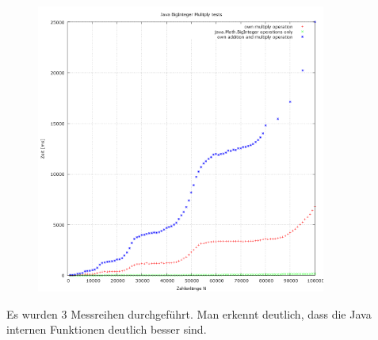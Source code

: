 \documentclass[ngerman,a4paper]{report}
\begin{document}

\begin{figure}[h]
    \begin{center}
        \includegraphics[width=360px]{testdaten.png}
    \end{center}
\end{figure}
Es wurden 3 Messreihen durchgeführt. Man erkennt deutlich, dass die Java internen Funktionen deutlich besser sind. \\
\newpage
\end{document}
